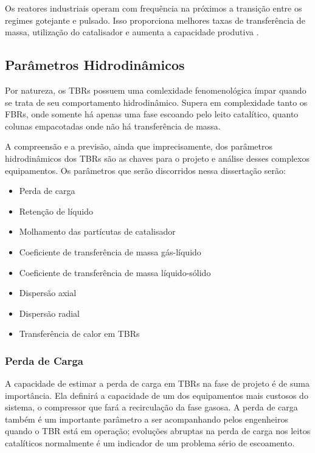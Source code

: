 Os reatores industriais operam com frequência na próximos a transição entre os
regimes gotejante e pulsado. Isso proporciona melhores taxas de transferência de
massa, utilização do catalisador e aumenta a capacidade produtiva
\cite{Ancheyta2011}.

\subsection{Parâmetros Hidrodinâmicos}
\label{sec:parametroshidrodinamicos}

Por natureza, os TBRs possuem uma comlexidade fenomenológica ímpar quando se
trata de seu comportamento hidrodinâmico. Supera em complexidade tanto os FBRs,
onde somente há apenas uma fase escoando pelo leito catalítico, quanto colunas
empacotadas onde não há transferência de massa. 

A compreensão e a previsão, ainda que imprecisamente, dos parâmetros
hidrodinâmicos dos TBRs são as chaves para o projeto e análise desses complexos
equipamentos. Os parâmetros que serão discorridos nessa dissertação
serão: 

\begin{itemize}
  \item Perda de carga
  \item Retenção de líquido
  \item Molhamento das partícutas de catalisador
  \item Coeficiente de transferência de massa gás-líquido
  \item Coeficiente de transferência de massa líquido-sólido
  \item Dispersão axial
  \item Dispersão radial
  \item Transferência de calor em TBRs
\end{itemize}


\subsubsection{Perda de Carga}
\label{sec:perdadecarga}

A capacidade de estimar a perda de carga em TBRs na fase de projeto é de suma
importância. Ela definirá a capacidade de um dos equipamentos mais custosos do
sistema, o compressor que fará a recirculação da fase gasosa. A perda de carga
também é um importante parâmetro a ser acompanhando pelos engenheiros quando o
TBR está em operação; evoluções abruptas na perda de carga nos leitos
catalíticos normalmente é um indicador de um problema sério de
escoamento.

